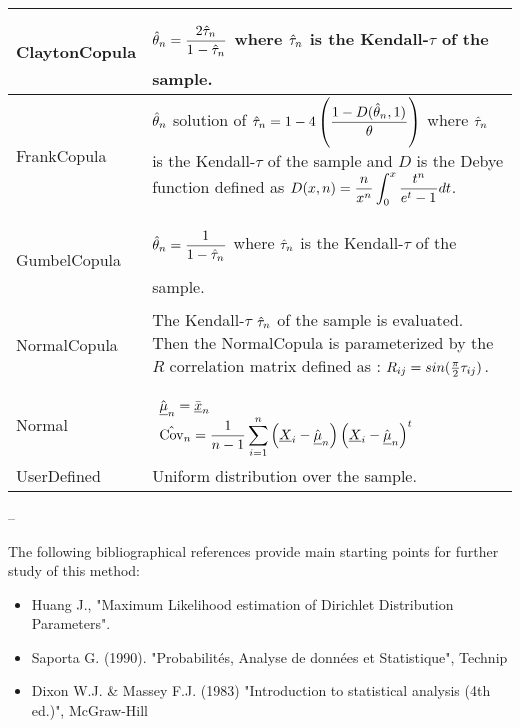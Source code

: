 {  \begin{tabular}{|l|p{12cm}|}
    \hline
    ClaytonCopula & $\displaystyle\Hat{\theta}_n=\frac{2\Hat{\tau}_n^{\strut}}{1_{\strut} - \Hat{\tau}_n}$ where $\Hat{\tau}_n$ is the Kendall-$\tau$ of the sample.\\
    \hline
    FrankCopula & $\Hat{\theta}_n$ solution of $\displaystyle \Hat{\tau}_n = 1-4\left( \frac{1-D(\Hat{\theta}_n, 1)^{\strut}}{\theta} \right)$ where $\Hat{\tau}_n$ is the Kendall-$\tau$ of the sample and $D$ is the Debye function defined as $\displaystyle D(x, n)=\frac{n}{x^n}\int_0^x \frac{t^n}{e^t-1_{\strut}} dt$.\\
    \hline
    GumbelCopula & $\displaystyle \Hat{\theta}_n=\frac{1^{\strut}}{1 - \Hat{\tau}_{n_{\strut}}}$ where $\Hat{\tau}_n$ is the Kendall-$\tau$ of the sample.\\
    \hline
    NormalCopula &  The Kendall-$\tau$ $\Hat{\tau}_n^{\strut}$ of the sample is evaluated. Then the NormalCopula is parameterized by the $R$ correlation matrix defined as : $R_{ij} = sin(\frac{\pi}{2}\tau_{ij})_{\strut}$.\\
    \hline
    Normal & $\begin{array}{l}
      \displaystyle\Hat{{\underline{\mu}}}_n^{\strut} = \bar{{\underline{x}}}_n\\
      \displaystyle\Hat{\mathrm{Cov}}_n = \frac{1}{n-1}\sum_{i=1}^n\left({\underline{X}}_i-\Hat{{\underline{\mu}}}_n\right)\left({\underline{X}}_i-\Hat{{\underline{\mu}}}_n\right)^t
    \end{array}$\\
    \hline
    UserDefined & Uniform distribution over the sample.\\
    \hline
  \end{tabular}


}
{
  --
}


{
  The following bibliographical references provide main starting points for further study of  this method:
  \begin{itemize}
  \item Huang J., "Maximum Likelihood estimation of Dirichlet Distribution Parameters".
  \item Saporta G. (1990). "Probabilités, Analyse de données et Statistique", Technip
  \item Dixon W.J. \& Massey F.J. (1983) "Introduction to statistical analysis (4th ed.)", McGraw-Hill
  \end{itemize}
}

